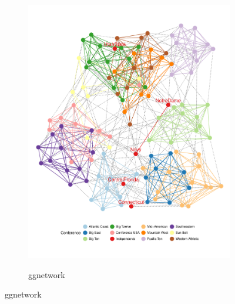 \begin{figure}[hbtp]
\begin{subfigure}[t]{\textwidth}
\begin{adjustbox}{valign=t}
\begin{minipage}{.49\textwidth}
\includegraphics[width=\textwidth]{figure/football_geom_net-1.pdf}

                          \end{minipage}

                          \end{adjustbox}
\end{subfigure}
%
\begin{subfigure}[t]{\textwidth}
\caption{ggnetwork}\vspace{-.5cm}

\vspace{1em}

             \begin{adjustbox}{valign=t}


\end{adjustbox}
\end{subfigure}
\end{figure}
